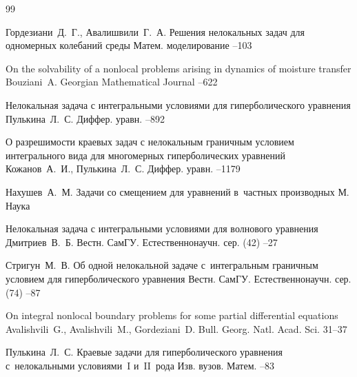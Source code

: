 \begin{thebibliography}{99}

\by Гордезиани~Д.~Г., Авалишвили~Г.~А.
\paper Решения нелокальных задач для одномерных колебаний среды
\jour Матем. моделирование
--103


\paper On the solvability of a nonlocal problems arising in dynamics of moisture transfer
\by Bouziani~A.
\jour Georgian Mathematical Journal
--622

\paper Нелокальная задача с интегральными условиями для гиперболического уравнения
\by Пулькина~Л.~С.
\jour Диффер. уравн.
--892


\paper О разрешимости краевых задач с нелокальным граничным условием интегрального вида для многомерных гиперболических уравнений
\by    Кожанов~А.~И., Пулькина~Л.~С.
\jour Диффер. уравн.
--1179


\by Нахушев~А.~М.
\book Задачи со смещением для уравнений в~частных производных
\publaddr М.
\publ Наука

\paper Нелокальная задача с интегральными условиями  для волнового уравнения
\by    Дмитриев~В.~Б.
\jour Вестн. СамГУ. Естественнонаучн. сер.
(42)
--27

\by Стригун~М.~В.
\paper Об одной нелокальной задаче с~интегральным граничным условием для гиперболического уравнения
\jour Вестн. СамГУ. Естественнонаучн. сер.
(74)
--87


\paper On integral nonlocal boundary problems for some partial differential equations
\by    Avalishvili~G., Avalishvili~M., Gordeziani~D.
\jour  Bull. Georg. Natl. Acad. Sci.
\pages \mbox{31--37}

\by Пулькина~Л.~С.
\paper Краевые задачи для гиперболического уравнения с~нелокальными условиями~I и~II~рода
\jour Изв. вузов. Матем.
--83



\end{thebibliography}
